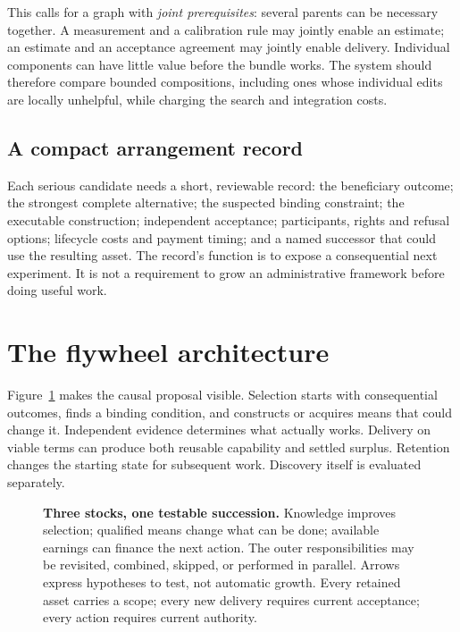 \documentclass[10pt,a4paper]{article}
\begin{document}
This calls for a graph with \emph{joint prerequisites}: several parents can be necessary together. A measurement and a calibration rule may jointly enable an estimate; an estimate and an acceptance agreement may jointly enable delivery. Individual components can have little value before the bundle works. The system should therefore compare bounded compositions, including ones whose individual edits are locally unhelpful, while charging the search and integration costs.

\subsection{A compact arrangement record}

Each serious candidate needs a short, reviewable record: the beneficiary outcome; the strongest complete alternative; the suspected binding constraint; the executable construction; independent acceptance; participants, rights and refusal options; lifecycle costs and payment timing; and a named successor that could use the resulting asset. The record's function is to expose a consequential next experiment. It is not a requirement to grow an administrative framework before doing useful work.

\section{The flywheel architecture}\label{sec:wheel}

Figure~\ref{fig:wheel} makes the causal proposal visible. Selection starts with consequential outcomes, finds a binding condition, and constructs or acquires means that could change it. Independent evidence determines what actually works. Delivery on viable terms can produce both reusable capability and settled surplus. Retention changes the starting state for subsequent work. Discovery itself is evaluated separately.

\begin{figure}[htbp]
\centering

\caption{\textbf{Three stocks, one testable succession.} Knowledge improves selection; qualified means change what can be done; available earnings can finance the next action. The outer responsibilities may be revisited, combined, skipped, or performed in parallel. Arrows express hypotheses to test, not automatic growth. Every retained asset carries a scope; every new delivery requires current acceptance; every action requires current authority.}
\label{fig:wheel}
\end{figure}
\end{document}

